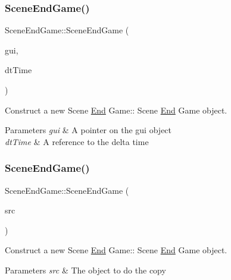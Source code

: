 \subsubsection{\texorpdfstring{Scene\+End\+Game()}{SceneEndGame()}\hspace{0.1cm}{\footnotesize\ttfamily [1/2]}}
{\footnotesize\ttfamily Scene\+End\+Game\+::\+Scene\+End\+Game (\begin{DoxyParamCaption}\item[{\hyperlink{class_gui}{Gui} $\ast$}]{gui,  }\item[{float const \&}]{dt\+Time }\end{DoxyParamCaption})}



Construct a new Scene \hyperlink{class_end}{End} Game\+:\+: Scene \hyperlink{class_end}{End} Game object. 


\begin{DoxyParams}{Parameters}
{\em gui} & A pointer on the gui object \\
\hline
{\em dt\+Time} & A reference to the delta time \\
\hline
\end{DoxyParams}
\mbox{\label{class_scene_end_game_a5dd61310665b7dd7d8c521aec22d596f}} 
\subsubsection{\texorpdfstring{Scene\+End\+Game()}{SceneEndGame()}\hspace{0.1cm}{\footnotesize\ttfamily [2/2]}}
{\footnotesize\ttfamily Scene\+End\+Game\+::\+Scene\+End\+Game (\begin{DoxyParamCaption}\item[{\hyperlink{class_scene_end_game}{Scene\+End\+Game} const \&}]{src }\end{DoxyParamCaption})}



Construct a new Scene \hyperlink{class_end}{End} Game\+:\+: Scene \hyperlink{class_end}{End} Game object. 


\begin{DoxyParams}{Parameters}
{\em src} & The object to do the copy \\
\hline
\end{DoxyParams}


